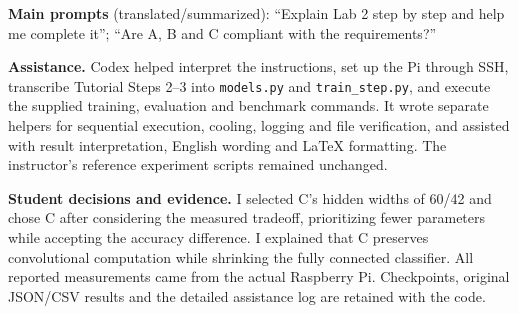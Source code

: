 \documentclass[11pt,letterpaper]{article}
\begin{document}
\textbf{Main prompts} (translated/summarized): ``Explain Lab 2 step by step and help me complete it''; ``Are A, B and C compliant with the requirements?''

\textbf{Assistance.} Codex helped interpret the instructions, set up the Pi through SSH, transcribe Tutorial Steps 2--3 into \texttt{models.py} and \texttt{train\_step.py}, and execute the supplied training, evaluation and benchmark commands. It wrote separate helpers for sequential execution, cooling, logging and file verification, and assisted with result interpretation, English wording and LaTeX formatting. The instructor's reference experiment scripts remained unchanged.

\textbf{Student decisions and evidence.} I selected C's hidden widths of 60/42 and chose C after considering the measured tradeoff, prioritizing fewer parameters while accepting the accuracy difference. I explained that C preserves convolutional computation while shrinking the fully connected classifier. All reported measurements came from the actual Raspberry Pi. Checkpoints, original JSON/CSV results and the detailed assistance log are retained with the code.
\end{document}
